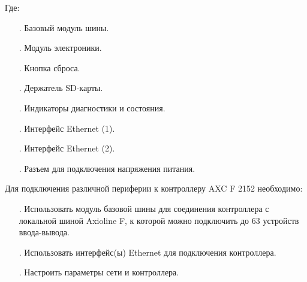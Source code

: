 {	\par \redline Где:

	\begin{itemize}[leftmargin=2.15cm, labelwidth=0.65cm, labelsep=0.0cm] 

		\item[\theitemcntr. ] Базовый модуль шины.
		\addtocounter{itemcntr}{1}

		\item[\theitemcntr. ] Модуль электроники.
		\addtocounter{itemcntr}{1}

		\item[\theitemcntr. ] Кнопка сброса.
		\addtocounter{itemcntr}{1}

		\item[\theitemcntr. ] Держатель SD-карты.
		\addtocounter{itemcntr}{1}

		\item[\theitemcntr. ] Индикаторы диагностики и состояния.
		\addtocounter{itemcntr}{1}

		\item[\theitemcntr. ] Интерфейс Ethernet (1).
		\addtocounter{itemcntr}{1}

		\item[\theitemcntr. ] Интерфейс Ethernet (2).
		\addtocounter{itemcntr}{1}

		\item[\theitemcntr. ] Разъем для подключения напряжения питания.
		\addtocounter{itemcntr}{1}

	\end{itemize} \setcounter{itemcntr}{1}

	\par \redline Для подключения различной периферии к контроллеру AXC F 2152 необходимо:

	\begin{itemize}[leftmargin=2.15cm, labelwidth=0.65cm, labelsep=0.0cm] 

		\item[\theitemcntr. ] Использовать модуль базовой шины для соединения контроллера с локальной шиной Axioline F, к которой можно подключить до 63 устройств ввода-вывода.
		\addtocounter{itemcntr}{1}

		\item[\theitemcntr. ] Использовать интерфейс(ы) Ethernet для подключения контроллера.
		\addtocounter{itemcntr}{1}

		\item[\theitemcntr. ] Настроить параметры сети и контроллера.
		\addtocounter{itemcntr}{1}


\end{itemize}}
